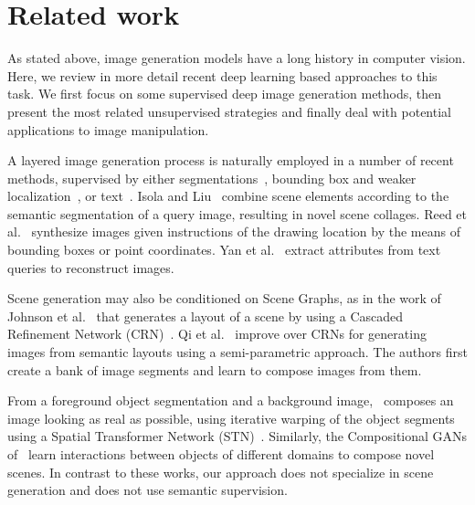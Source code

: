 \documentclass[10pt,twocolumn,letterpaper]{article}
\def\mypar#1{\vspace{1mm}{\bf #1.}\hspace{1mm}}
\begin{document}
\section{Related work}

As stated above, image generation models have a long history in computer vision. Here, we review in more detail recent deep learning based approaches to this task.
We first focus on some supervised deep image generation methods, then present the most related unsupervised strategies and finally deal with potential applications to image manipulation.

\mypar{Supervised deep scene generation} 
A layered image generation process is naturally employed in a number of recent methods, supervised by either segmentations~\cite{SceneCollaging}, bounding box and weaker localization~\cite{Reed2016LearningWhat}, or text~\cite{Yan2016Attribute2Image}. Isola and Liu~\cite{SceneCollaging} combine scene elements according to the semantic segmentation of a query image, resulting in  novel scene collages. Reed et al.~\cite{Reed2016LearningWhat}  synthesize images given instructions of the drawing location by the means of bounding boxes or point coordinates. Yan et al.~\cite{Yan2016Attribute2Image} extract attributes from text queries to reconstruct images.

Scene generation may also be conditioned on Scene Graphs, as in the work of Johnson et al.~\cite{Johnson2018Scene} that generates a layout of a scene by using a Cascaded Refinement Network (CRN)~\cite{Chen17Photographic}.
Qi et al.~\cite{Qi2018SemiParametric} improve over CRNs for generating images from semantic layouts using a semi-parametric approach. The authors first create a bank of image segments and learn to compose images from them. 

 From a foreground object segmentation and a background image,~\cite{Lin2018STGAN} composes an image looking as real as possible, using iterative warping of the object segments using a Spatial Transformer Network (STN)~\cite{Jaderberg2015STN}. Similarly, the Compositional GANs of~\cite{Azadi2018compositional} learn interactions between objects of different domains to compose novel scenes.
In contrast to these works, our approach does not specialize in scene generation and does not use semantic supervision.
\end{document}
